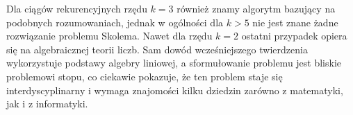 \documentclass[leqno,10pt]{article}
\begin{document}
Dla ciągów rekurencyjnych rzędu $k=3$ również znamy algorytm bazujący na podobnych rozumowaniach, jednak w ogólności dla $k>5$ nie jest znane żadne rozwiązanie problemu Skolema. Nawet dla rzędu $k=2$ ostatni przypadek opiera się na algebraicznej teorii liczb. Sam dowód wcześniejszego twierdzenia wykorzystuje podstawy algebry liniowej, a sformułowanie problemu jest bliskie problemowi stopu, co ciekawie pokazuje, że ten problem staje się interdyscyplinarny i wymaga znajomości kilku dziedzin zarówno z matematyki, jak i z informatyki. 
\end{document}
